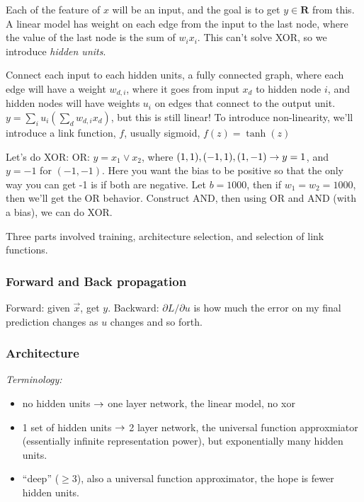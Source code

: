 Each of the feature of $x$ will be an input, and the goal is to get
$y\in \mathbf{R}$ from this. A linear model has weight on each edge
from the input to the last node, where the value of the last node is
the sum of $w_ix_i$. This can't solve XOR, so we introduce
\emph{hidden units}.

Connect each input to each hidden units, a fully connected graph,
where each edge will have a weight $w_{d,i}$, where it goes from input
$x_d$ to hidden node $i$, and hidden nodes will have weights $u_i$ on
edges that connect to the output unit.
$y=\sum_iu_i(\sum_dw_{d,i}x_d)$, but this is still linear! To
introduce non-linearity, we'll introduce a link function, $f$, usually
sigmoid, $f(z) = \tanh(z)$

Let's do XOR:
OR: $y=x_1 \vee x_2$, where $(1,1),(-1,1),(1,-1)\rightarrow  y=1$, and
$y=-1$ for $(-1,-1)$. Here you want the bias to be positive so that the
only way you can get -1 is if both are negative. Let $b=1000$, then if
$w_1=w_2=1000$, then we'll get the OR behavior.
Construct AND, then using OR and AND (with a bias), we can do XOR.

Three parts involved training, architecture selection, and selection
of link functions.

\subsubsection{Forward and Back propagation}
\label{sec:forwardback}
Forward: given $\vec x$, get $y$. 
Backward: $\partial L/\partial u $ is how much the error on my final prediction
changes as $u$ changes and so forth.

\subsubsection{Architecture}

\emph{Terminology:}
\begin{itemize}
\item  no hidden units $\rightarrow$ one layer network, the linear model, no xor
\item 1 set of hidden units $\rightarrow$ 2 layer network, the universal
  function approxmiator (essentially infinite representation power),
  but exponentially many hidden units.
\item ``deep'' ($\ge 3$), also a universal function approximator, the hope
  is fewer hidden units.
\end{itemize}



